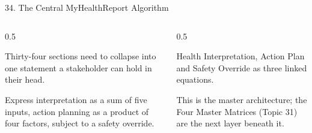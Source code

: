 \documentclass[9pt,aspectratio=169]{beamer}
\begin{document}
\begin{frame}{34. The Central MyHealthReport Algorithm}
\begin{columns}[T,onlytextwidth]
\begin{column}{0.5\textwidth}
\begin{tcolorbox}[colback=blue!7,colframe=blue!55!black,title=\textbf{Motivation},boxrule=0.6pt,arc=1mm,left=5pt,right=5pt,top=3pt,bottom=3pt,fonttitle=\small]
\footnotesize Thirty-four sections need to collapse into one statement a stakeholder can hold in their head.
\end{tcolorbox}
\vspace{5pt}
\begin{tcolorbox}[colback=teal!7,colframe=teal!55!black,title=\textbf{Method},boxrule=0.6pt,arc=1mm,left=5pt,right=5pt,top=3pt,bottom=3pt,fonttitle=\small]
\footnotesize Express interpretation as a sum of five inputs, action planning as a product of four factors, subject to a safety override.
\end{tcolorbox}
\end{column}
\begin{column}{0.5\textwidth}
\begin{tcolorbox}[colback=green!8,colframe=green!45!black,title=\textbf{Result},boxrule=0.6pt,arc=1mm,left=5pt,right=5pt,top=3pt,bottom=3pt,fonttitle=\small]
\footnotesize Health Interpretation, Action Plan and Safety Override as three linked equations.
\end{tcolorbox}
\vspace{5pt}
\begin{tcolorbox}[colback=orange!10,colframe=orange!65!black,title=\textbf{Conclusion},boxrule=0.6pt,arc=1mm,left=5pt,right=5pt,top=3pt,bottom=3pt,fonttitle=\small]
\footnotesize This is the master architecture; the Four Master Matrices (Topic 31) are the next layer beneath it.
\end{tcolorbox}
\end{column}
\end{columns}
\end{frame}
\end{document}
